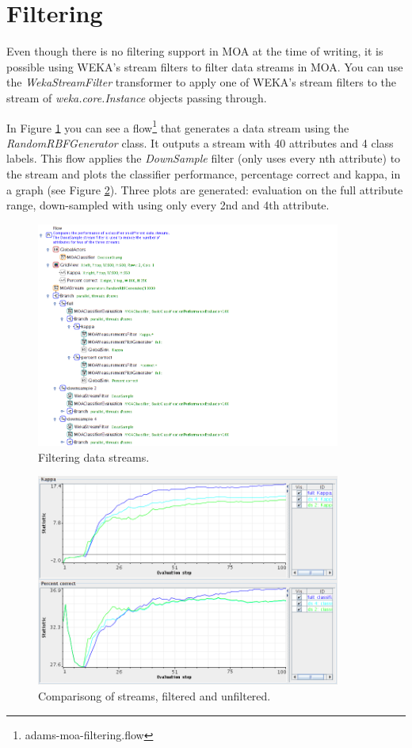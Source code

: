 \documentclass[a4paper]{book}
\begin{document}
\clearpage
\newpage
\section{Filtering}
Even though there is no filtering support in MOA at the time of writing, it is
possible using WEKA's stream filters to filter data streams in MOA.
You can use the \textit{WekaStreamFilter} transformer to apply one of WEKA's
stream filters to the stream of \textit{weka.core.Instance} objects passing
through.

In Figure \ref{moa-stream-filtering_flow} you can see a flow\footnote{adams-moa-filtering.flow} 
that generates a data stream using the \textit{RandomRBFGenerator} class. It
outputs a stream with 40 attributes and 4 class labels. This flow applies
the \textit{DownSample} filter (only uses every nth attribute) to the stream
and plots the classifier performance, percentage correct and kappa, in a graph
(see Figure \ref{moa-stream-filtering_output}). Three plots are generated: evaluation
on the full attribute range, down-sampled with using only every 2nd and 4th
attribute.

\begin{figure}[htb]
  \centering
  \includegraphics[width=10.0cm]{images/moa-stream-filtering_flow.png}
  \caption{Filtering data streams.}
  \label{moa-stream-filtering_flow}
\end{figure}

\begin{figure}[htb]
  \centering
  \includegraphics[width=10.0cm]{images/moa-stream-filtering_output.png}
  \caption{Comparisong of streams, filtered and unfiltered.}
  \label{moa-stream-filtering_output}
\end{figure}
\end{document}
